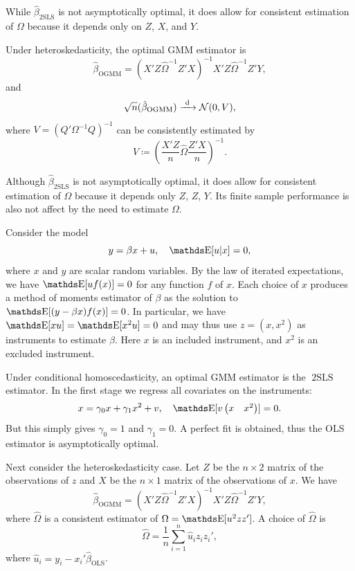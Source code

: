 \documentclass[letterpaper, 10pt]{article}
\DeclareMathOperator{\OLS}{OLS}
\DeclareMathOperator{\OGMM}{OGMM}
\DeclareMathOperator{\TSLS}{2SLS}
\begin{document}
While \(\hat{\beta}_{\TSLS}\) is not asymptotically optimal, it does allow for consistent estimation of \(\Omega\) because it depends only on \(Z\), \(X\), and \(Y\).

Under heteroskedasticity, the optimal GMM estimator is
\[
  \hat{\beta}_{\OGMM}
  = (X' Z \hat{\Omega}^{-1} Z' X)^{-1} X' Z \hat{\Omega}^{-1} Z' Y,
\]
and
\[
  \sqrt{n} (\hat{\beta}_{\OGMM})
  \longdistto \Normal(0, V),
\]
where \(V = (Q' \Omega^{-1} Q)^{-1}\) can be consistently estimated by
\[
  \hat{V}
  \coloneqq \left( \frac{X'Z}{n} \hat{\Omega} \frac{Z' X}{n} \right)^{-1}.
\]


\begin{remark}
  Although \(\hat{\beta}_{\TSLS}\) is not asymptotically optimal, it does allow for consistent estimation of \(\Omega\) because it depends only \(Z\), \(Z\), \(Y\).
  Its finite sample performance is also not affect by the need to estimate \(\Omega\).
\end{remark}

\begin{example}
  Consider the model
  \[
    y = \beta x + u, \quad \E[u|x] = 0,
  \]
  where \(x\) and \(y\) are scalar random variables.
  By the law of iterated expectations, we have \(\E[u f(x)] = 0\) for any function \(f\) of \(x\).
  Each choice of \(x\) produces a method of moments estimator of \(\beta\) as the solution to \(\E[(y - \beta x) f(x)] = 0\).
  In particular, we have \(\E[xu] = \E[x^2u] = 0\) and may thus use \(z = (x, x^2)\) as instruments to estimate \(\beta\).
  Here \(x\) is an included instrument, and \(x^2\) is an excluded instrument.

  Under conditional homoscedasticity, an optimal GMM estimator is the \(\TSLS\) estimator.
  In the first stage we regress all covariates on the instruments:
  \[
    x = \gamma_0 x + \gamma_1 x^2 + v, \quad \E[v\pmat{x & x^2}] = 0.
  \]
  But this simply gives \(\gamma_0 = 1\) and \(\gamma_1 = 0\).
  A perfect fit is obtained, thus the OLS estimator is asymptotically optimal.

  Next consider the heteroskedasticity case.
  Let \(Z\) be the \(n \times 2\) matrix of the observations of \(z\) and \(X\) be the \(n \times 1\) matrix of the observations of \(x\).
  We have
  \[
    \hat{\beta}_{\OGMM}
    = (X' Z \hat{\Omega}^{-1} Z' X)^{-1} X' Z \hat{\Omega}^{-1} Z' Y,
  \]
  where \(\hat{\Omega}\) is a consistent estimator of \(\Omega = \E[u^2 zz']\).
  A choice of \(\hat{\Omega}\) is
  \[
    \hat{\Omega}
    = \frac{1}{n} \sum_{i=1}^n \hat{u}_i z_i z_i',
  \]
  where \(\hat{u}_i = y_i - x_i' \hat{\beta}_{\OLS}\).
\end{example}
\end{document}
